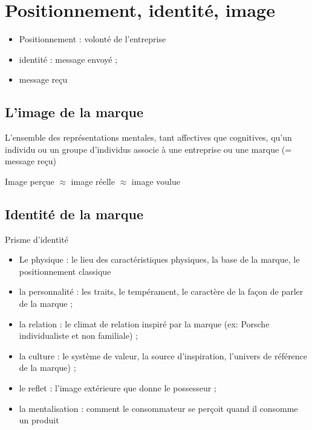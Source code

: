 	
	\section{Positionnement, identité, image}
	
	\begin{itemize}
		\item Positionnement : volonté de l'entreprise
		\item identité : message envoyé ;
		\item message reçu
	\end{itemize}
	
		\subsection{L'image de la marque}
		
		L'ensemble des représentations mentales, tant affectives que cognitives, qu'un individu ou un groupe d'individus associe à une entreprise ou une marque (= message reçu)
		
		Image perçue $\approx$ image réelle $\approx$ image voulue
		
		
		
		\subsection{Identité de la marque}
		
		Prisme d'identité 
		
		
		\begin{itemize}
			\item Le physique : le lieu des caractéristiques physiques, la base de la marque, le positionnement classique
			\item la personnalité : les traits, le tempérament, le caractère de la façon de parler de la marque ;
			\item la relation : le climat de relation inspiré par la marque (ex:  Porsche individualiste et non familiale) ;
			\item la culture : le système de valeur, la source d'inspiration, l'univers de référence de la marque) ;
			\item le reflet : l'image extérieure que donne le possesseur ;
			\item la mentalisation : comment le consommateur se perçoit quand il consomme un produit
		\end{itemize}
		
